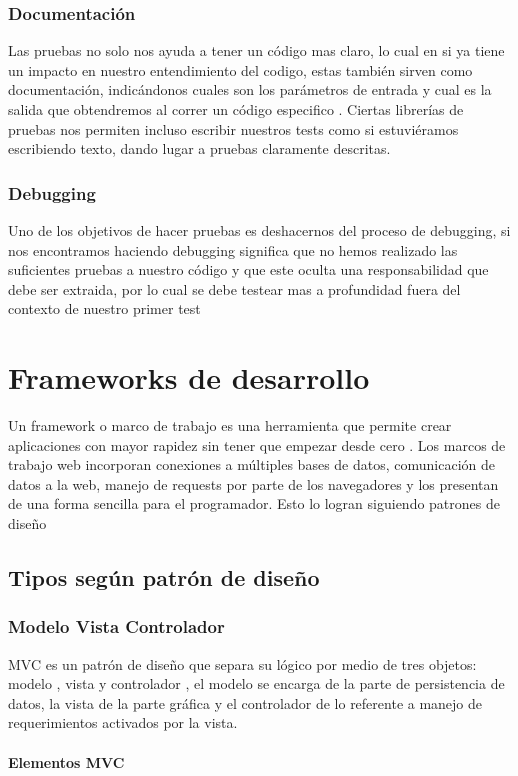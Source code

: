 \subsubsection{Documentación}
Las pruebas no solo nos ayuda a tener un código mas claro, lo cual en si ya
tiene un impacto en nuestro entendimiento del codigo, estas también sirven como
documentación, indicándonos cuales son los parámetros de entrada y cual es la
salida que obtendremos al correr un código especifico . Ciertas librerías de
pruebas nos permiten incluso escribir nuestros tests como si estuviéramos
escribiendo texto, dando lugar a pruebas claramente descritas.

\subsubsection{Debugging}
Uno de los objetivos de hacer pruebas es deshacernos
del proceso de debugging, si nos encontramos haciendo debugging significa que
no hemos realizado las suficientes pruebas a nuestro código y que este oculta
una responsabilidad que debe ser extraida, por lo cual se debe testear mas a
profundidad fuera del contexto de nuestro primer test

\section{Frameworks de desarrollo}
Un framework o marco de trabajo es una herramienta que permite crear
aplicaciones con mayor rapidez sin tener que empezar desde cero . Los marcos de
trabajo web incorporan conexiones a múltiples bases de datos, comunicación de
datos a la web, manejo de requests por parte de los navegadores y los presentan
de una forma sencilla para el programador. Esto lo logran siguiendo patrones de
diseño

\subsection{Tipos según patrón de diseño}
\subsubsection{Modelo Vista Controlador}
MVC es un patrón de diseño que separa su lógico por medio de tres objetos:
modelo , vista y controlador , el modelo se encarga de la parte de persistencia
de datos, la vista de la parte gráfica y el controlador de lo referente a
manejo de requerimientos activados por la vista.

\paragraph{Elementos MVC}

